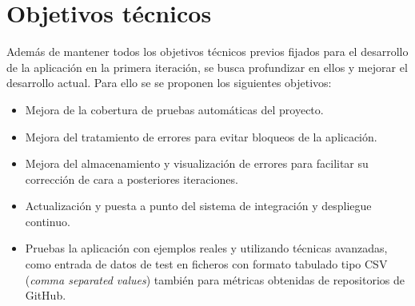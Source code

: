 \section{Objetivos técnicos}
Además de mantener todos los objetivos técnicos previos fijados para el desarrollo de la aplicación en la primera iteración, se busca profundizar en ellos y mejorar el desarrollo actual. Para ello se se proponen los siguientes objetivos:
\begin{itemize}
	\tightlist
	\item Mejora de la cobertura de pruebas automáticas del proyecto. 
	\item Mejora del tratamiento de errores para evitar bloqueos de la aplicación.
	\item Mejora del almacenamiento y visualización de errores para facilitar su corrección de cara a posteriores iteraciones.
	\item Actualización y puesta a punto del sistema de integración y despliegue continuo.
	\item Pruebas la aplicación con ejemplos reales y utilizando técnicas avanzadas, como entrada de datos de test en ficheros con formato tabulado tipo CSV (\textit{comma separated values}) también para métricas obtenidas de repositorios de GitHub. 	
\end{itemize}


